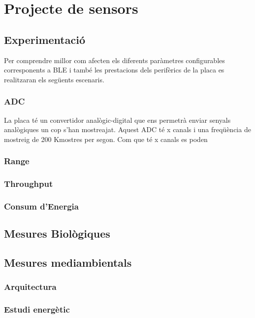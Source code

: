 \chapter{Projecte de sensors}
\section{Experimentació}
Per comprendre millor com afecten els diferents paràmetres configurables corresponents a BLE i també les prestacions dels perifèrics de la placa es realitzaran els següents escenaris.

\subsection{ADC}
La placa té un convertidor analògic-digital que ens permetrà enviar senyals analògiques un cop s'han mostreajat.
Aquest ADC té x canals i una freqüència de mostreig de 200 Kmostres per segon.
Com que té x canals es poden 


\subsection{Range}
\subsection{Throughput}
\subsection{Consum d'Energia}


\section{Mesures Biològiques}
\section{Mesures mediambientals}
\subsection{Arquitectura}
\subsection{Estudi energètic}